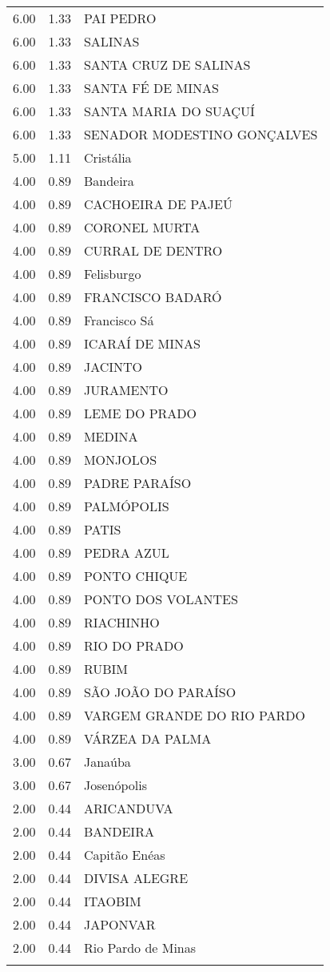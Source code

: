 \documentclass[a4paper, 12pt, openright, oneside, english, brazil, article]{abntex2}
\begin{document}
\begin{scriptsize}
\begin{longtable}{rrl}
		6.00 & 1.33 & PAI PEDRO \\ 
		6.00 & 1.33 & SALINAS \\ 
		6.00 & 1.33 & SANTA CRUZ DE SALINAS \\ 
		6.00 & 1.33 & SANTA FÉ DE MINAS \\ 
		6.00 & 1.33 & SANTA MARIA DO SUAÇUÍ \\ 
		6.00 & 1.33 & SENADOR MODESTINO GONÇALVES \\ 
		5.00 & 1.11 & Cristália \\ 
		4.00 & 0.89 & Bandeira \\ 
		4.00 & 0.89 & CACHOEIRA DE PAJEÚ \\ 
		4.00 & 0.89 & CORONEL MURTA \\ 
		4.00 & 0.89 & CURRAL DE DENTRO \\ 
		4.00 & 0.89 & Felisburgo \\ 
		4.00 & 0.89 & FRANCISCO BADARÓ \\ 
		4.00 & 0.89 & Francisco Sá \\ 
		4.00 & 0.89 & ICARAÍ DE MINAS \\ 
		4.00 & 0.89 & JACINTO \\ 
		4.00 & 0.89 & JURAMENTO \\ 
		4.00 & 0.89 & LEME DO PRADO \\ 
		4.00 & 0.89 & MEDINA \\ 
		4.00 & 0.89 & MONJOLOS \\ 
		4.00 & 0.89 & PADRE PARAÍSO \\ 
		4.00 & 0.89 & PALMÓPOLIS \\ 
		4.00 & 0.89 & PATIS \\ 
		4.00 & 0.89 & PEDRA AZUL \\ 
		4.00 & 0.89 & PONTO CHIQUE \\ 
		4.00 & 0.89 & PONTO DOS VOLANTES \\ 
		4.00 & 0.89 & RIACHINHO \\ 
		4.00 & 0.89 & RIO DO PRADO \\ 
		4.00 & 0.89 & RUBIM \\ 
		4.00 & 0.89 & SÃO JOÃO DO PARAÍSO \\ 
		4.00 & 0.89 & VARGEM GRANDE DO RIO PARDO \\ 
		4.00 & 0.89 & VÁRZEA DA PALMA \\ 
		3.00 & 0.67 & Janaúba \\ 
		3.00 & 0.67 & Josenópolis \\ 
		2.00 & 0.44 & ARICANDUVA \\ 
		2.00 & 0.44 & BANDEIRA \\ 
		2.00 & 0.44 & Capitão Enéas \\ 
		2.00 & 0.44 & DIVISA ALEGRE \\ 
		2.00 & 0.44 & ITAOBIM \\ 
		2.00 & 0.44 & JAPONVAR \\ 
		2.00 & 0.44 & Rio Pardo de Minas \\ 
		\hline
		\hline
		\label{poc-operacao}
	\end{longtable}
	\end{scriptsize}
	
\end{document}
